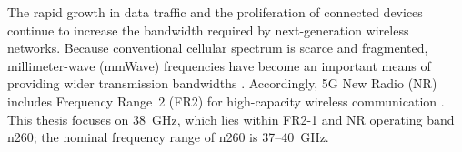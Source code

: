 The rapid growth in data traffic and the proliferation of connected devices continue to increase the bandwidth required by next-generation wireless networks. Because conventional cellular spectrum is scarce and fragmented, millimeter-wave (mmWave) frequencies have become an important means of providing wider transmission bandwidths \cite{Rappaport2013}. Accordingly, 5G New Radio (NR) includes Frequency Range~2 (FR2) for high-capacity wireless communication \cite{TSGR2021}. This thesis focuses on 38~GHz, which lies within FR2-1 and NR operating band n260; the nominal frequency range of n260 is 37--40~GHz.


